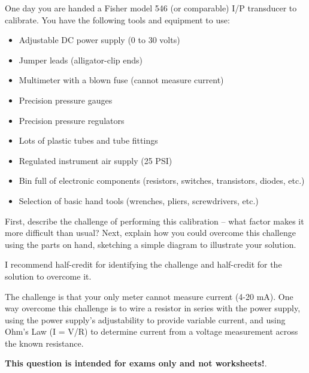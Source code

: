 

One day you are handed a Fisher model 546 (or comparable) I/P transducer to calibrate.  You have the following tools and equipment to use:

\begin{itemize}
\item{} Adjustable DC power supply (0 to 30 volts)
\item{} Jumper leads (alligator-clip ends)
\item{} Multimeter with a blown fuse (cannot measure current)
\item{} Precision pressure gauges
\item{} Precision pressure regulators
\item{} Lots of plastic tubes and tube fittings
\item{} Regulated instrument air supply (25 PSI)
\item{} Bin full of electronic components (resistors, switches, transistors, diodes, etc.)
\item{} Selection of basic hand tools (wrenches, pliers, screwdrivers, etc.)
\end{itemize}

First, describe the challenge of performing this calibration -- what factor makes it more difficult than usual?  Next, explain how you could overcome this challenge using the parts on hand, sketching a simple diagram to illustrate your solution.







I recommend half-credit for identifying the challenge and half-credit for the solution to overcome it.

\vskip 10pt

The challenge is that your only meter cannot measure current (4-20 mA).  One way overcome this challenge is to wire a resistor in series with the power supply, using the power supply's adjustability to provide variable current, and using Ohm's Law (I = V/R) to determine current from a voltage measurement across the known resistance.







{\bf This question is intended for exams only and not worksheets!}.



